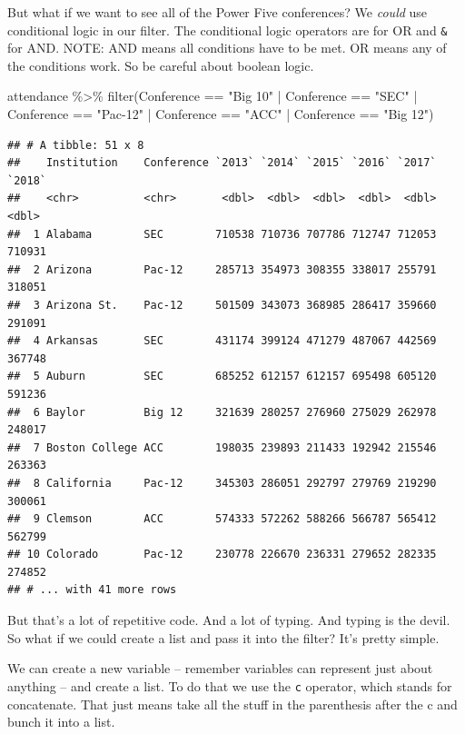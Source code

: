 \documentclass[
]{book}
\newenvironment{Shaded}{\begin{snugshade}}{\end{snugshade}}
\newcommand{\FunctionTok}[1]{\textcolor[rgb]{0.00,0.00,0.00}{#1}}
\newcommand{\NormalTok}[1]{#1}
\newcommand{\SpecialCharTok}[1]{\textcolor[rgb]{0.00,0.00,0.00}{#1}}
\newcommand{\StringTok}[1]{\textcolor[rgb]{0.31,0.60,0.02}{#1}}
\begin{document}
But what if we want to see all of the Power Five conferences? We \emph{could} use conditional logic in our filter. The conditional logic operators are \texttt{\textbar{}} for OR and \texttt{\&} for AND. NOTE: AND means all conditions have to be met. OR means any of the conditions work. So be careful about boolean logic.

\begin{Shaded}
\begin{Highlighting}[]
\NormalTok{attendance }\SpecialCharTok{\%\textgreater{}\%} \FunctionTok{filter}\NormalTok{(Conference }\SpecialCharTok{==} \StringTok{"Big 10"} \SpecialCharTok{|}\NormalTok{ Conference }\SpecialCharTok{==} \StringTok{"SEC"} \SpecialCharTok{|}\NormalTok{ Conference }\SpecialCharTok{==} \StringTok{"Pac{-}12"} \SpecialCharTok{|}\NormalTok{ Conference }\SpecialCharTok{==} \StringTok{"ACC"} \SpecialCharTok{|}\NormalTok{ Conference }\SpecialCharTok{==} \StringTok{"Big 12"}\NormalTok{)}
\end{Highlighting}
\end{Shaded}

\begin{verbatim}
## # A tibble: 51 x 8
##    Institution    Conference `2013` `2014` `2015` `2016` `2017` `2018`
##    <chr>          <chr>       <dbl>  <dbl>  <dbl>  <dbl>  <dbl>  <dbl>
##  1 Alabama        SEC        710538 710736 707786 712747 712053 710931
##  2 Arizona        Pac-12     285713 354973 308355 338017 255791 318051
##  3 Arizona St.    Pac-12     501509 343073 368985 286417 359660 291091
##  4 Arkansas       SEC        431174 399124 471279 487067 442569 367748
##  5 Auburn         SEC        685252 612157 612157 695498 605120 591236
##  6 Baylor         Big 12     321639 280257 276960 275029 262978 248017
##  7 Boston College ACC        198035 239893 211433 192942 215546 263363
##  8 California     Pac-12     345303 286051 292797 279769 219290 300061
##  9 Clemson        ACC        574333 572262 588266 566787 565412 562799
## 10 Colorado       Pac-12     230778 226670 236331 279652 282335 274852
## # ... with 41 more rows
\end{verbatim}

But that's a lot of repetitive code. And a lot of typing. And typing is the devil. So what if we could create a list and pass it into the filter? It's pretty simple.

We can create a new variable -- remember variables can represent just about anything -- and create a list. To do that we use the \texttt{c} operator, which stands for concatenate. That just means take all the stuff in the parenthesis after the c and bunch it into a list.
\end{document}
